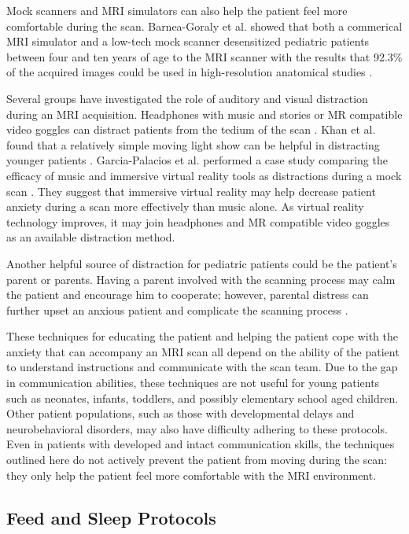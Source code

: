 Mock scanners and MRI simulators can also help the patient feel more comfortable during the scan. Barnea-Goraly et al. showed that both a commerical MRI simulator and a low-tech mock scanner desensitized pediatric patients between four and ten years of age to the MRI scanner with the results that 92.3\% of the acquired images could be used in high-resolution anatomical studies \cite{Barnea-Goraly2014}. 

Several groups have investigated the role of auditory and visual distraction during an MRI acquisition. Headphones with music and stories or MR compatible video goggles can distract patients from the tedium of the scan \cite{Alexander2012} \cite{Barnea-Goraly2014} \cite{Harned2001}. Khan et al. found that a relatively simple moving light show can be helpful in distracting younger patients \cite{Khan2007}. Garcia-Palacios et al. performed a case study comparing the efficacy of music and immersive virtual reality tools as distractions during a mock scan \cite{Garcia-Palacios2007}. They suggest that immersive virtual reality may help decrease patient anxiety during a scan more effectively than music alone. As virtual reality technology improves, it may join headphones and MR compatible video goggles as an available distraction method.

Another helpful source of distraction for pediatric patients could be the patient's parent or parents. Having a parent involved with the scanning process may calm the patient and encourage him to cooperate; however, parental distress can further upset an anxious patient and complicate the scanning process \cite{Alexander2012}. 

These techniques for educating the patient and helping the patient cope with the anxiety that can accompany an MRI scan all depend on the ability of the patient to understand instructions and communicate with the scan team. Due to the gap in communication abilities, these techniques are not useful for young patients such as neonates, infants, toddlers, and possibly elementary school aged children. Other patient populations, such as those with developmental delays and neurobehavioral disorders, may also have difficulty adhering to these protocols. Even in patients with developed and intact communication skills, the techniques outlined here do not actively prevent the patient from moving during the scan: they only help the patient feel more comfortable with the MRI environment.

\subsection{Feed and Sleep Protocols}

